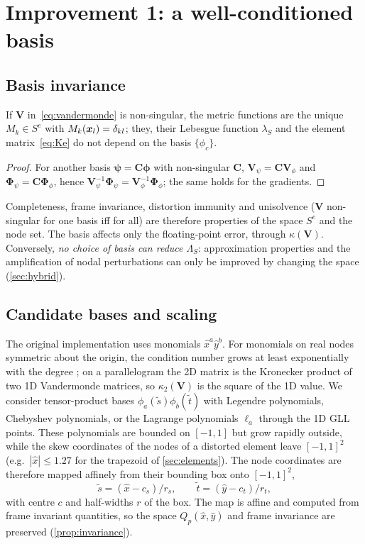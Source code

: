 \section{Improvement 1: a well-conditioned basis}\label{sec:basis}
\subsection{Basis invariance}
\begin{proposition}\label{prop:invariance}
If $\bm V$ in~\eqref{eq:vandermonde} is non-singular, the metric functions are the unique
$M_k\in S^e$ with $M_k(\bm{x}_l)=\delta_{kl}$; they, their Lebesgue function $\lambda_S$ and the
element matrix~\eqref{eq:Ke} do not depend on the basis $\{\phi_c\}$.
\end{proposition}
\begin{proof}
For another basis $\bm\psi=\bm C\bm\phi$ with non-singular $\bm C$, $\bm V_\psi=\bm C\bm
V_\phi$ and $\bm\Phi_\psi=\bm C\bm\Phi_\phi$, hence $\bm V_\psi^{-1}\bm\Phi_\psi=\bm
V_\phi^{-1}\bm\Phi_\phi$; the same holds for the gradients.
\end{proof}
Completeness, frame invariance, distortion immunity and unisolvence ($\bm V$ non-singular for
one basis iff for all) are therefore properties of the space $S^e$ and the node set. The basis
affects only the floating-point error, through $\kappa(\bm V)$. Conversely, \emph{no choice of
basis can reduce $\Lambda_S$}: approximation properties and the amplification of nodal
perturbations can only be improved by changing the space (\cref{sec:hybrid}).

\subsection{Candidate bases and scaling}
The original implementation uses monomials $\hat x^a\hat y^b$. For monomials on real nodes
symmetric about the origin, the condition number grows at least exponentially with the degree
\cite{Gautschi1988Lower}; on a parallelogram the 2D matrix is the Kronecker product of two 1D
Vandermonde matrices, so $\kappa_2(\bm V)$ is the square of the 1D value. We consider
tensor-product bases $\phi_a(\tilde s)\phi_b(\tilde t)$ with Legendre polynomials,
Chebyshev polynomials, or the Lagrange polynomials $\ell_a$ through the 1D GLL points. These
polynomials are bounded on $[-1,1]$ but grow rapidly outside, while the skew coordinates of
the nodes of a distorted element leave $[-1,1]^2$ (e.g.\ $|\hat x|\le1.27$ for the trapezoid of
\cref{sec:elements}). The node coordinates are therefore mapped affinely from their bounding
box onto $[-1,1]^2$,
\begin{equation}
  \tilde s=(\hat x-c_s)/r_s ,\qquad \tilde t=(\hat y-c_t)/r_t ,
  \label{eq:bbox}
\end{equation}
with centre $c$ and half-widths $r$ of the box. The map is affine and computed from frame
invariant quantities, so the space $Q_p(\hat x,\hat y)$ and frame invariance are preserved
(\cref{prop:invariance}).

